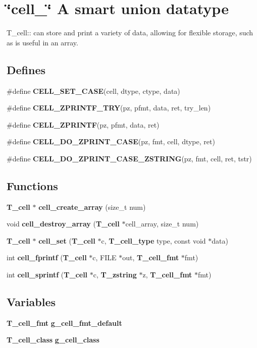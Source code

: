 \section{\char`\"{}cell\_\-\char`\"{} A smart union datatype}
\label{group__table__cell}
T\_\-cell:: can store and print a variety of data, allowing for flexible storage, such as is useful in an array. 
\subsection*{Defines}
\begin{CompactItemize}
\item 
\#define {\bf CELL\_\-SET\_\-CASE}(cell, dtype, ctype, data)
\item 
\#define {\bf CELL\_\-ZPRINTF\_\-TRY}(pz, pfmt, data, ret, try\_\-len)
\item 
\#define {\bf CELL\_\-ZPRINTF}(pz, pfmt, data, ret)
\item 
\#define {\bf CELL\_\-DO\_\-ZPRINT\_\-CASE}(pz, fmt, cell, dtype, ret)
\item 
\#define {\bf CELL\_\-DO\_\-ZPRINT\_\-CASE\_\-ZSTRING}(pz, fmt, cell, ret, tstr)
\end{CompactItemize}
\subsection*{Functions}
\begin{CompactItemize}
\item 
{\bf T\_\-cell} $\ast$ {\bf cell\_\-create\_\-array} (size\_\-t num)
\item 
void {\bf cell\_\-destroy\_\-array} ({\bf T\_\-cell} $\ast$cell\_\-array, size\_\-t num)
\item 
{\bf T\_\-cell} $\ast$ {\bf cell\_\-set} ({\bf T\_\-cell} $\ast$c, {\bf T\_\-cell\_\-type} type, const void $\ast$data)
\item 
int {\bf cell\_\-fprintf} ({\bf T\_\-cell} $\ast$c, FILE $\ast$out, {\bf T\_\-cell\_\-fmt} $\ast$fmt)
\item 
int {\bf cell\_\-sprintf} ({\bf T\_\-cell} $\ast$c, {\bf T\_\-zstring} $\ast$z, {\bf T\_\-cell\_\-fmt} $\ast$fmt)
\end{CompactItemize}
\subsection*{Variables}
\begin{CompactItemize}
\item 
{\bf T\_\-cell\_\-fmt} {\bf g\_\-cell\_\-fmt\_\-default}
\item 
{\bf T\_\-cell\_\-class} {\bf g\_\-cell\_\-class}
\end{CompactItemize}


